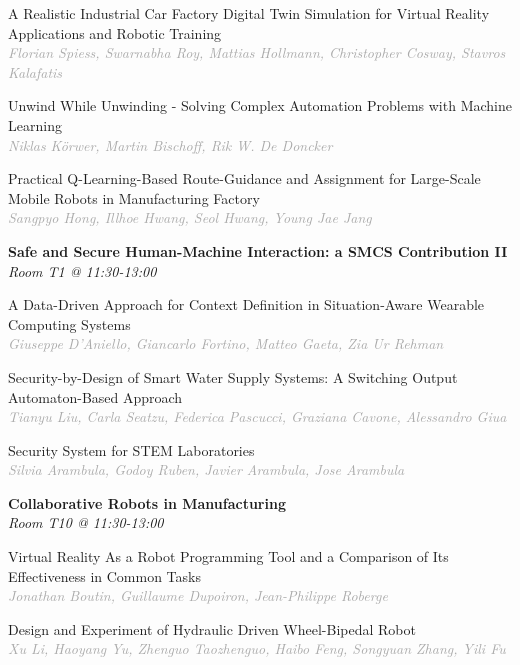 \begin{multicols*}{2}
\small A Realistic Industrial Car Factory Digital Twin Simulation for Virtual Reality Applications and Robotic Training\\ 
\footnotesize \textcolor{darkgray}{\textit{Florian Spiess, Swarnabha  Roy, Mattias  Hollmann, Christopher  Cosway, Stavros  Kalafatis}}

\small Unwind While Unwinding - Solving Complex Automation Problems with Machine Learning\\ 
\footnotesize \textcolor{darkgray}{\textit{Niklas Körwer, Martin  Bischoff, Rik W.  De Doncker}}

\small Practical Q-Learning-Based Route-Guidance and Assignment for Large-Scale Mobile Robots in Manufacturing Factory\\ 
\footnotesize \textcolor{darkgray}{\textit{Sangpyo Hong, Illhoe  Hwang, Seol  Hwang, Young Jae  Jang}}

\normalsize \textbf{Safe and Secure Human-Machine Interaction: a SMCS Contribution II}\\
\small \textit{Room T1 @ 11:30-13:00}

\small A Data-Driven Approach for Context Definition in Situation-Aware Wearable Computing Systems\\ 
\footnotesize \textcolor{darkgray}{\textit{Giuseppe D'Aniello, Giancarlo  Fortino, Matteo  Gaeta, Zia Ur  Rehman}}

\small Security-by-Design of Smart Water Supply Systems: A Switching Output Automaton-Based Approach\\ 
\footnotesize \textcolor{darkgray}{\textit{Tianyu Liu, Carla  Seatzu, Federica  Pascucci, Graziana  Cavone, Alessandro  Giua}}

\small Security System for STEM Laboratories\\ 
\footnotesize \textcolor{darkgray}{\textit{Silvia Arambula, Godoy  Ruben, Javier  Arambula, Jose  Arambula}}

\normalsize \textbf{Collaborative Robots in Manufacturing}\\
\small \textit{Room T10 @ 11:30-13:00}

\small Virtual Reality As a Robot Programming Tool and a Comparison of Its Effectiveness in Common Tasks\\ 
\footnotesize \textcolor{darkgray}{\textit{Jonathan Boutin, Guillaume  Dupoiron, Jean-Philippe  Roberge}}

\small Design and Experiment of Hydraulic Driven Wheel-Bipedal Robot\\ 
\footnotesize \textcolor{darkgray}{\textit{Xu Li, Haoyang  Yu, Zhenguo  Taozhenguo, Haibo  Feng, Songyuan  Zhang, Yili  Fu}}


\end{multicols*}
